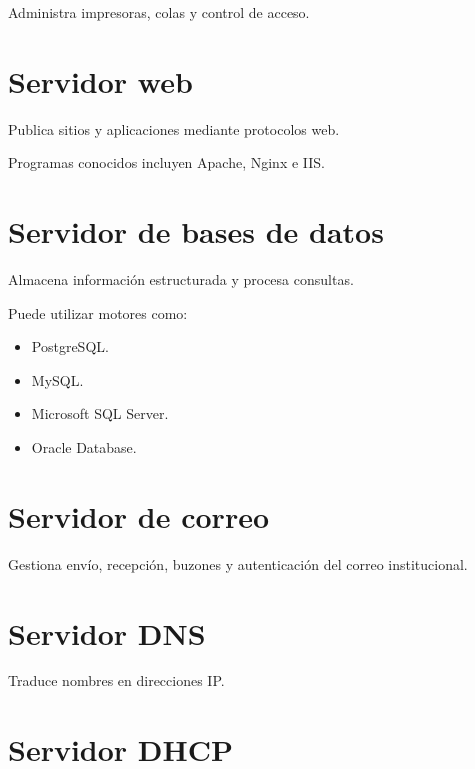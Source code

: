 \documentclass[
  spanish,
  letterpaper,
]{scrbook}
\providecommand{\tightlist}{%
  \setlength{\itemsep}{0pt}\setlength{\parskip}{0pt}}
\begin{document}
Administra impresoras, colas y control de acceso.


\chapter{Servidor web}\label{servidor-web}

Publica sitios y aplicaciones mediante protocolos web.

Programas conocidos incluyen Apache, Nginx e IIS.


\chapter{Servidor de bases de datos}\label{servidor-de-bases-de-datos}

Almacena información estructurada y procesa consultas.

Puede utilizar motores como:

\begin{itemize}
\tightlist
\item
  PostgreSQL.
\item
  MySQL.
\item
  Microsoft SQL Server.
\item
  Oracle Database.
\end{itemize}


\chapter{Servidor de correo}\label{servidor-de-correo}

Gestiona envío, recepción, buzones y autenticación del correo
institucional.


\chapter{Servidor DNS}\label{servidor-dns}

Traduce nombres en direcciones IP.


\chapter{Servidor DHCP}\label{servidor-dhcp}
\end{document}
